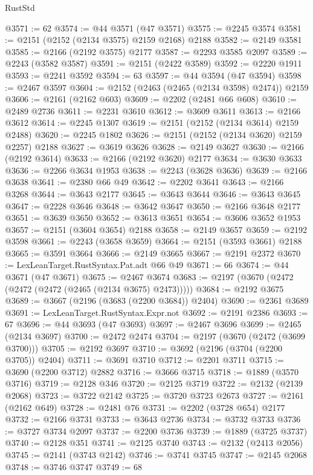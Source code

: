 \begin{lexlean}{RustStd}
\begin{coremodule}
@3571 := 62
@3574 := @44 @3571 (@47 @3571)
@3575 := @2245 @3574
@3581 := @2151 (@2152 (@2134 @3575) @2159 @2168) @2188
@3582 := @2149 @3581
@3585 := @2166 (@2192 @3575) @2177
@3587 := @2293 @3585 @2097
@3589 := @2243 (@3582 @3587)
@3591 := @2151 (@2422 @3589)
@3592 := @2220 @1911
@3593 := @2241 @3592
@3594 := 63
@3597 := @44 @3594 (@47 @3594)
@3598 := @2467 @3597
@3604 := @2152 (@2463 (@2465 (@2134 @3598) @2474)) @2159
@3606 := @2161 (@2162 @603)
@3609 := @2202 (@2481 @66 @608)
@3610 := @2489 @2736
@3611 := @2231 @3610
@3612 := @3609 @3611
@3613 := @2166 @3612
@3614 := @2245 @1307
@3619 := @2151 (@2152 (@2134 @3614) @2159 @2488)
@3620 := @2245 @1802
@3626 := @2151 (@2152 (@2134 @3620) @2159 @2257) @2188
@3627 := @3619 @3626
@3628 := @2149 @3627
@3630 := @2166 (@2192 @3614)
@3633 := @2166 (@2192 @3620) @2177
@3634 := @3630 @3633
@3636 := @2266 @3634 @1953
@3638 := @2243 (@3628 @3636)
@3639 := @2166 @3638
@3641 := @2380 @66 @49
@3642 := @2202 @3641
@3643 := @2166 @3268
@3644 := @3643 @2177
@3645 := @3643 @3644
@3646 := @3643 @3645
@3647 := @2228 @3646
@3648 := @3642 @3647
@3650 := @2166 @3648 @2177
@3651 := @3639 @3650
@3652 := @3613 @3651
@3654 := @3606 @3652 @1953
@3657 := @2151 (@3604 @3654) @2188
@3658 := @2149 @3657
@3659 := @2192 @3598
@3661 := @2243 (@3658 @3659)
@3664 := @2151 (@3593 @3661) @2188
@3665 := @3591 @3664
@3666 := @2149 @3665
@3667 := @2191 @2372
@3670 := LexLeanTarget.RustSyntax.Pat.adt @66 @49
@3671 := 66
@3674 := @44 @3671 (@47 @3671)
@3675 := @2467 @3674
@3683 := @2197 (@3670 (@2472 (@2472 (@2472 (@2465 (@2134 @3675) @2473)))))
@3684 := @2192 @3675
@3689 := @3667 (@2196 (@3683 (@2200 @3684)) @2404)
@3690 := @2361 @3689
@3691 := LexLeanTarget.RustSyntax.Expr.not
@3692 := @2191 @2386
@3693 := 67
@3696 := @44 @3693 (@47 @3693)
@3697 := @2467 @3696
@3699 := @2465 (@2134 @3697)
@3700 := @2472 @2474
@3704 := @2197 (@3670 (@2472 (@3699 @3700)))
@3705 := @2192 @3697
@3710 := @3692 (@2196 (@3704 (@2200 @3705)) @2404)
@3711 := @3691 @3710
@3712 := @2201 @3711
@3715 := @3690 (@2200 @3712) @2882
@3716 := @3666 @3715
@3718 := @1889 (@3570 @3716)
@3719 := @2128 @346
@3720 := @2125 @3719
@3722 := @2132 (@2139 @2068)
@3723 := @3722 @2142
@3725 := @3720 @3723 @2673
@3727 := @2161 (@2162 @649)
@3728 := @2481 @76
@3731 := @2202 (@3728 @654) @2177
@3732 := @2166 @3731
@3733 := @3643 @2736
@3734 := @3732 @3733
@3736 := @3727 @3734 @2097
@3737 := @2200 @3736
@3739 := @1889 (@3725 @3737)
@3740 := @2128 @351
@3741 := @2125 @3740
@3743 := @2132 (@2413 @2056)
@3745 := @2141 (@3743 @2142)
@3746 := @3741 @3745
@3747 := @2145 @2068
@3748 := @3746 @3747
@3749 := 68

\end{coremodule}
\end{lexlean}
